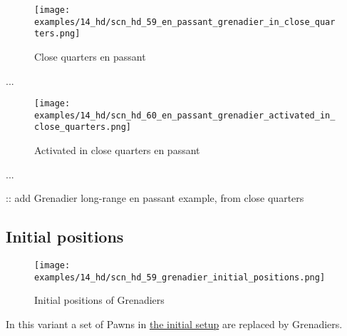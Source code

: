 \vspace*{-1.1\baselineskip}
\noindent
\begin{wrapfigure}[1]{l}{0.4\textwidth}
\centering
\texttt{[image: examples/14\_hd/scn\_hd\_59\_en\_passant\_grenadier\_in\_close\_quarters.png]}
\vspace*{-1.4\baselineskip}
\caption{Close quarters en passant}
\label{fig:scn_hd_59_en_passant_grenadier_in_close_quarters}
\end{wrapfigure}
...

\vspace*{13.1\baselineskip}
\noindent
\begin{wrapfigure}[1]{l}{0.4\textwidth}
\centering
\texttt{[image: examples/14\_hd/scn\_hd\_60\_en\_passant\_grenadier\_activated\_in\_close\_quarters.png]}
\vspace*{-1.4\baselineskip}
\caption{Activated in close quarters en passant}
\label{fig:scn_hd_60_en_passant_grenadier_activated_in_close_quarters}
\end{wrapfigure}
...

\vspace*{13.7\baselineskip}
\TODO :: add Grenadier long-range en passant example, from close quarters

\clearpage %

\subsection*{Initial positions}
\label{sec:Hemera's Dawn/Grenadier/Initial positions}

\vspace*{-1.2\baselineskip}
\noindent
\begin{figure}[!h]
\texttt{[image: examples/14\_hd/scn\_hd\_59\_grenadier\_initial\_positions.png]}
\vspace*{-1.3\baselineskip}
\caption{Initial positions of Grenadiers}
\label{fig:scn_hd_59_grenadier_initial_positions}
\end{figure}

\vspace*{-0.5\baselineskip}
In this variant a set of Pawns in
\hyperref[fig:14_hemera_s_dawn]{the initial setup} are replaced by Grenadiers.

